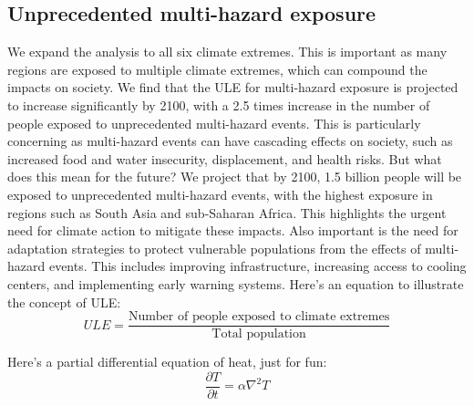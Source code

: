 \documentclass[9pt, twoside]{extarticle}
\begin{document}
\begin{maintext}
\section*{Unprecedented multi-hazard exposure}
We expand the analysis to all six climate extremes. This is important as many regions are exposed to multiple climate extremes, which can compound the impacts on society. We find that the ULE for multi-hazard exposure is projected to increase significantly by 2100, with a 2.5 times increase in the number of people exposed to unprecedented multi-hazard events.\cite{Grant2025} This is particularly concerning as multi-hazard events can have cascading effects on society, such as increased food and water insecurity, displacement, and health risks.\cite{IPCC2021} But what does this mean for the future? We project that by 2100, 1.5 billion people will be exposed to unprecedented multi-hazard events, with the highest exposure in regions such as South Asia and sub-Saharan Africa.\cite{Grant2025} This highlights the urgent need for climate action to mitigate these impacts. Also important is the need for adaptation strategies to protect vulnerable populations from the effects of multi-hazard events. This includes improving infrastructure, increasing access to cooling centers, and implementing early warning systems.\cite{IPCC2021}
Here's an equation to illustrate the concept of ULE:
\begin{equation}
    ULE = \frac{\text{Number of people exposed to climate extremes}}{\text{Total population}}
\end{equation}

Here's a partial differential equation of heat, just for fun:
\begin{equation}
    \frac{\partial T}{\partial t} = \alpha \nabla^2 T
\end{equation}


\end{maintext}
\end{document}
